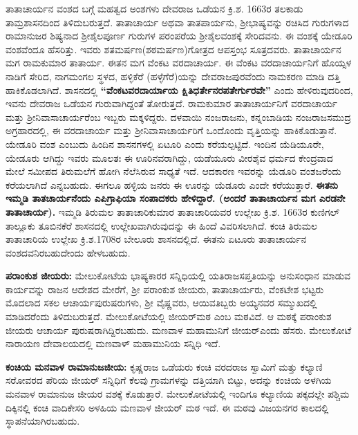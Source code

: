ತಾತಾಚಾರ್ಯನ ವಂಶದ ಬಗ್ಗೆ ಮಹತ್ವದ ಅಂಶಗಳು ದೇವರಾಜ ಒಡೆಯನ ಕ್ರಿ.ಶ. 1663ರ ತಲಕಾಡು ತಾಮ್ರಶಾಸನದಿಂದ ತಿಳಿದುಬರುತ್ತದೆ. ತಾತಾಚಾರ್ಯ ಅಥವಾ ತಾತಪಾರ್ಯನು, ಶ‍್ರೀಭಾಷ್ಯವನ್ನು ರಚಿಸಿದ ಗುರುಗಳಾದ ರಾಮಾನುಜರ ಶಿಷ್ಯನಾದ ಶ‍್ರೀಶೈಲಪೂರ್ಣ ಗುರುಗಳ ಪರಂಪರೆಯ ಶ‍್ರೀಶೈಲವಂಶಕ್ಕೆ ಸೇರಿದವನು. ಈ ವಂಶಕ್ಕೆ ಯೇಡೂರಿ ವಂಶವೆಂದೂ ಹೆಸರಿತ್ತು. ಇವರು ಶತಮರ್ಷಣ(ಶಠಮರ್ಷಣ)ಗೋತ್ರದ ಆಪಸ್ತಂಭ ಸೂತ್ರದವರು. ತಾತಾಚಾರ್ಯನ ಮಗ ರಾಮಕುಮಾರ ತಾತಾರ್ಯ. ಈತನ ಮಗ ವೆಂಕಟ ವರದಾಚಾರ್ಯ. ಈ ವೆಂಕಟ ವರದಾಚಾರ್ಯನಿಗೆ ಹೊಯ್ಸಳ ನಾಡಿಗೆ ಸೇರಿದ, ನಾಗಮಂಗಲ ಸ್ಥಳದ, ಹಳ್ಳಿಕೆರೆ (ಹಳ್ಳೆಗೆರೆ)ಯನ್ನು ದೇವರಾಜಪುರವೆಂದು ನಾಮಕರಣ ಮಾಡಿ ದತ್ತಿ ಹಾಕಿಕೊಡಲಾಗಿದೆ. ಶಾಸನದಲ್ಲಿ \textbf{“ವೆಂಕಟವರದಾರ್ಯಾಯ ಕ್ಷಿತಿಧರ್ತೇನರಪತೇರ್ಗುರವೇ”} ಎಂದು ಹೇಳಿರುವುದರಿಂದ, ಇವನು ದೇವರಾಜ ಒಡೆಯನ ಗುರುವಾಗಿದ್ದಂತೆ ತೋರುತ್ತದೆ. ರಾಮಕುಮಾರ ತಾತಾಚಾರ್ಯನಿಗೆ ವರದಾಚಾರ್ಯ ಮತ್ತು ಶ‍್ರೀನಿವಾಸಾಚಾರ್ಯರೆಂಬ ಇಬ್ಬರು ಮಕ್ಕಳಿದ್ದರು. ದಳವಾಯಿ ನಂಜರಾಜನು, ಕನ್ನಂಬಾಡಿಯ ನಂಜರಾಜಸಮುದ್ರ ಅಗ್ರಹಾರದಲ್ಲಿ, ಈ ವರದಾಚಾರ್ಯ ಮತ್ತು ಶ‍್ರೀನಿವಾಸಾಚಾರ್ಯರಿಗೆ ಒಂದೊಂದು ವೃತ್ತಿಯನ್ನು ಹಾಕಿಕೊಡುತ್ತಾನೆ. ಯೇಡೂರಿ ವಂಶ ಎಂಬುದು ಹಿಂದಿನ ಶಾಸನಗಳಲ್ಲಿ ಏಟೂರಿ ಎಂದು ಕರೆಯಲ್ಪಟ್ಟಿದೆ. ಇಂದಿನ ಯೆಡಿಯೂರೇ, ಯೇಡೂರು ಆಗಿದ್ದು ಇವರು ಮೂಲತಃ ಈ ಊರಿನವರಾಗಿದ್ದು, ಯಡೆಯೂರು ವೀರಶೈವ ಧರ್ಮದ ಕೇಂದ್ರವಾದ ಮೇಲೆ ಸಮೀಪದ ತಿರುಮಲೆಗೆ ಹೋಗಿ ನೆಲೆಸಿರುವ ಸಾಧ್ಯತೆ ಇದೆ. ಆದಕಾರಣ ಇವರನ್ನು ಯೆಡೂರಿ ವಂಶಜರೆಂದು ಕರೆಯಲಾಗಿದೆ ಎನ್ನಬಹುದು. ಈಗಲೂ ಹಳ್ಳಿಯ ಜನರು ಈ ಊರನ್ನು ಯೆಡೂರು ಎಂದೇ ಕರೆಯುತ್ತಾರೆ. \textbf{ಈತನು ಇಮ್ಮಡಿ ತಾತಚಾರ್ಯನೆಂದು ಎಪಿಗ್ರಾಫಿಯಾ ಸಂಪಾದಕರು ಹೇಳಿದ್ದಾರೆ. (ಅಂದರೆ ತಾತಾಚಾರ್ಯನ ಮಗ ಎರಡನೇ ತಾತಾಚಾರ್ಯ).} ಇಮ್ಮಡಿ ತಿರುಮಲ ತಾತಾಚಾರಿಕುಮಾರ ತಾತಾಚಾರಿಯವರ ಉಲ್ಲೇಖ ಕ್ರಿ.ಶ. 1663ರ ಕುಣಿಗಲ್ ತಾಲ್ಲೂಕು ತೂಬಿನಕೆರೆ ಶಾಸನದಲ್ಲಿ ಉಲ್ಲೇಖವಾಗಿರುವುದನ್ನು ಈ ಹಿಂದೆ ವಿವರಿಸಲಾಗಿದೆ. ಕಂಚಿ ತಿರುಮಲ ತಾತಾಚಾರಿಯ ಉಲ್ಲೇಖ ಕ್ರಿ.ಶ.1708ರ ಬೇಲೂರು ಶಾಸನದಲ್ಲಿದೆ. ಈತನು ಏಟೂರು ತಾತಾಚಾರ್ಯನ ವಂಶದವನಿರಬಹುದೇಂದು ಹೇಳಬಹುದು.

\textbf{ಪರಾಂಕುಶ ಜೀಯರು:} ಮೇಲುಕೋಟೆಯ ಭಾಷ್ಯಕಾರರ ಸನ್ನಿಧಿಯಲ್ಲಿ ಯತಿರಾಜಸಪ್ತತಿಯನ್ನು ಅನುಸಂಧಾನ ಮಾಡುವ ಕಾರ್ಯವನ್ನು ರಾಜನ ಆದೇಶದ ಮೇರೆಗೆ, ಶ‍್ರೀ ಪರಾಂಕುಶ ಜೀಯರು, ತಾತಾಚಾರ್ಯರು, ವೆಂಕಟೇಶ ಭಟ್ಟರು ಮೊದಲಾದ ಸಕಲ ಆಚಾರ್ಯಪುರುಷರುಗಳು, ಶ‍್ರೀ ವೈಷ್ಣವರು, ಆಯಿವತಿಬ್ಬರು ಅಯ್ಯನವರ ಸಮ್ಮುಖದಲ್ಲಿ ಮಾಡಿದರೆಂದು ತಿಳಿದುಬರುತ್ತದೆ. ಮೇಲುಕೋಟೆಯಲ್ಲಿ ಜೀಯರ್​ಮಠ ಎಂಬ ಮಠವಿದೆ. ಆ ಮಠಕ್ಕೆ ಪರಾಂಕುಶ ಜೀಯರು ಆಚಾರ್ಯ ಪುರುಷರಾಗಿದ್ದಿರಬಹುದು. ಮಣವಾಳ ಮಹಾಮುನಿಗೆ ಜೀಯರ್​ ಎಂದು ಹೆಸರು. ಮೇಲುಕೋಟೆ ನಾರಾಯಣ ದೇವಾಲಯದಲ್ಲಿ ಮಣವಾಳ್​ ಮಹಾಮುನಿಯ ಸನ್ನಿಧಿ ಇದೆ.

\textbf{ಕಂಚಿಯ ಮನವಾಳ ರಾಮಾನುಜಜೀಯ: } ಕೃಷ್ಣರಾಜ ಒಡೆಯರು ಕಂಚಿ ವರದರಾಜ ಸ್ವಾಮಿಗೆ ಮತ್ತು ಕಲ್ಯಾಣಿ ಸರೋವರದ ಪೆರಿಯ ಜೀಯರ್​ ಸನ್ನಿಧಿಗೆ ಕೆಲವು ಗ್ರಾಮಗಳನ್ನು ದತ್ತಿಯಾಗಿ ಬಿಟ್ಟು, ಅದನ್ನು ಕಂಚಿಯ ಅಳಗಿಯ ಮನವಾಳ ರಾಮಾನುಜ ಜೀಯರ ವಶಕ್ಕೆ ಕೊಡುತ್ತಾರೆ. ಮೇಲುಕೋಟೆಯಲ್ಲಿ ಇಂದಿಗೂ ಕಲ್ಯಾಣಿಯ ಪಕ್ಕದಲ್ಲೇ ಪಶ್ಚಿಮ ದಿಕ್ಕಿನಲ್ಲಿ ಕಂಚಿ ವಾದಿಕೇಸರಿ ಅಳಹಿಯ ಮಣವಾಳ ಜೀಯರ್​ ಮಠ ಇದೆ. ಈ ಮಠವು ವಿಜಯನಗರ ಕಾಲದಲ್ಲಿ ಸ್ಥಾಪನೆಯಾಗಿರಬಹುದು.

